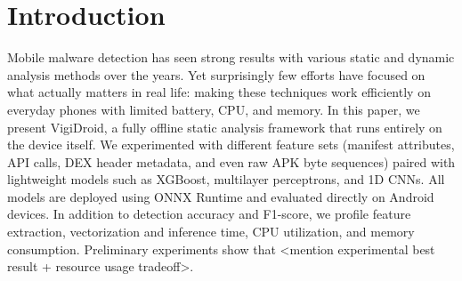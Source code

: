 \documentclass[conference]{IEEEtran}
\begin{document}
	\section{Introduction}
	Mobile malware detection has seen strong results with various static and dynamic analysis methods over the years. Yet surprisingly few efforts have focused on what actually matters in real life: making these techniques work efficiently on everyday phones with limited battery, CPU, and memory. In this paper, we present VigiDroid, a fully offline static analysis framework that runs entirely on the device itself. We experimented with different feature sets (manifest attributes, API calls, DEX header metadata, and even raw APK byte sequences) paired with lightweight models such as XGBoost, multilayer perceptrons, and 1D CNNs. All models are deployed using ONNX Runtime and evaluated directly on Android devices. In addition to detection accuracy and F1-score, we profile feature extraction, vectorization and inference time, CPU utilization, and memory consumption. Preliminary experiments show that <mention experimental best result + resource usage tradeoff>. 
	
	
\end{document}
